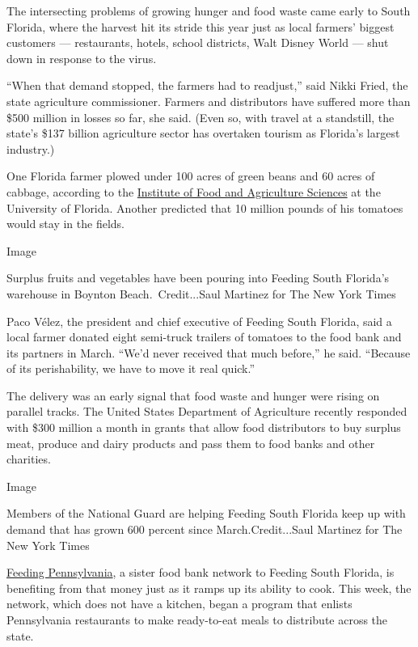 The intersecting problems of growing hunger and food waste came early to
South Florida, where the harvest hit its stride this year just as local
farmers' biggest customers --- restaurants, hotels, school districts,
Walt Disney World --- shut down in response to the virus.

``When that demand stopped, the farmers had to readjust,'' said Nikki
Fried, the state agriculture commissioner. Farmers and distributors have
suffered more than \$500 million in losses so far, she said. (Even so,
with travel at a standstill, the state's \$137 billion agriculture
sector has overtaken tourism as Florida's largest industry.)

One Florida farmer plowed under 100 acres of green beans and 60 acres of
cabbage, according to the \href{https://ifas.ufl.edu/}{Institute of Food
and Agriculture Sciences} at the University of Florida. Another
predicted that 10 million pounds of his tomatoes would stay in the
fields.

Image

Surplus fruits and vegetables have been pouring into Feeding South
Florida's warehouse in Boynton Beach.~Credit...Saul Martinez for The New
York Times

Paco Vélez, the president and chief executive of Feeding South Florida,
said a local farmer donated eight semi-truck trailers of tomatoes to the
food bank and its partners in March. ``We'd never received that much
before,'' he said. ``Because of its perishability, we have to move it
real quick.''

The delivery was an early signal that food waste and hunger were rising
on parallel tracks. The United States Department of Agriculture recently
responded with \$300 million a month in grants that allow food
distributors to buy surplus meat, produce and dairy products and pass
them to food banks and other charities.

Image

Members of the National Guard are helping Feeding South Florida keep up
with demand that has grown 600 percent since March.Credit...Saul
Martinez for The New York Times

\href{https://feedingpa.org/}{Feeding Pennsylvania}, a sister food bank
network to Feeding South Florida, is benefiting from that money just as
it ramps up its ability to cook. This week, the network, which does not
have a kitchen, began a program that enlists Pennsylvania restaurants to
make ready-to-eat meals to distribute across the state.


